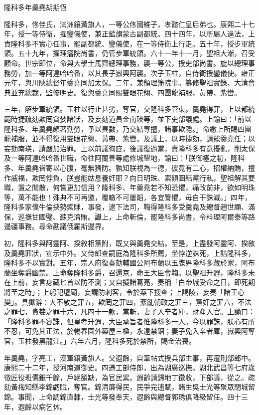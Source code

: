 
\begin{pinyinscope}
隆科多年羹堯胡期恆

隆科多，佟佳氏，滿洲鑲黃旗人，一等公佟國維子，孝懿仁皇后弟也。康熙二十七年，授一等侍衛，擢鑾儀使，兼正藍旗蒙古副都統。四十四年，以所屬人違法，上責隆科多不實心任事，罷副都統、鑾儀使，在一等侍衛上行走。五十年，授步軍統領。五十九年，擢理籓院尚書，仍管步軍統領。六十一年十一月，聖祖大漸，召受顧命。世宗即位，命與大學士馬齊總理事務，襲一等公，授吏部尚書。旋以總理事務勞，加一等阿達哈哈番，以其長子嶽興阿襲。次子玉柱，自侍衛授鑾儀使。雍正元年，與川陜總督年羹堯同加太保。二年，兼領理籓院事。纂修聖祖實錄、大清會典並充總裁，監修明史。復與羹堯同賜雙眼花翎、四團龍補服、黃帶、紫轡。

三年，解步軍統領。玉柱以行止甚劣，奪官，交隆科多管束。羹堯得罪，上以都統範時捷疏劾欺罔貪婪諸狀，及妄劾道員金南瑛等，並下吏部議處。上諭曰：「前以隆科多、年羹堯頗著勤勞，予以異數，乃交結專擅，諸事欺隱。」命繳上所賜四團龍補服，並不得復用雙眼花翎、黃帶、紫轡。及議上，以時捷劾，請罷羹堯任；以妄劾南瑛，請嚴加治罪。上以前議徇庇，後議復過當，責隆科多有意擾亂，削太保及一等阿達哈哈番世職，命往阿蘭善等處修城墾地，諭曰：「朕御極之初，隆科多、年羹堯皆寄以心腹，毫無猜防。孰知朕視為一德，彼竟有二心，招權納賄，擅作威福，欺罔悖負，朕豈能姑息養奸耶？向日明珠、索額圖結黨行私，聖祖解其要職，置之閒散，何嘗更加信用？隆科多、年羹堯若不知恐懼，痛改前非，欲如明珠等，萬不能也！殊典不可再邀，覆轍不可屢蹈，各宜警懼，毋自干誅滅。」四年，隆科多家僕牛倫挾勢索賕，事發，逮下法司，鞫得隆科多受羹堯及總督趙世顯、滿保，巡撫甘國璧、蘇克濟賄。讞上，上命斬倫，罷隆科多尚書，令料理阿爾泰等路邊疆事務。尋命勘議俄羅斯邊界。

初，隆科多與阿靈阿、揆敘相黨附，既又與羹堯交結。至是，上盡發阿靈阿、揆敘及羹堯罪狀，宣示中外。又侍郎查嗣庭為隆科多所薦，坐悖逆誅死，上詰隆科多，隆科多不以實對。五年，宗人府復奏劾輔國公阿布蘭以玉牒畀隆科多藏於家，阿布蘭坐奪爵幽禁。上命奪隆科多爵，召還京，命王大臣會鞫。以聖祖升遐，隆科多未在上前，妄言身藏匕首以防不測；又自擬諸葛亮，奏稱「白帝城受命之日，即死期將至之時」；上躬祀壇廟，妄謂防刺客，令於案下搜查；上謁陵，妄奏「諸王心變」。具獄辭：大不敬之罪五，欺罔之罪四，紊亂朝政之罪三，黨奸之罪六，不法之罪七，貪婪之罪十六，凡四十一款，當斬，妻子入辛者庫，財產入官。上諭曰：「隆科多罪不容誅，但皇考升遐，大臣承旨者惟隆科多一人。今以罪誅，朕心有所不忍，可免其正法，於暢春園外築屋三楹，永遠禁錮；妻子免入辛者庫，嶽興阿奪官，玉柱發黑龍江。」六年六月，隆科多死於禁所，賜金治喪。

年羹堯，字亮工，漢軍鑲黃旗人。父遐齡，自筆帖式授兵部主事，再遷刑部郎中。康熙二十二年，授河南道御史。四遷工部侍郎，出為湖廣巡撫。湖北武昌等七府歲徵匠役班價銀千餘，戶絕額缺，為官民累。遐齡請歸地丁徵收，下部議，從之。疏劾黃梅知縣李錦虧賦，奪官。錦清廉得民，民爭完逋賦，諸生吳士光等聚眾閉城留錦。事聞，上命調錦直隸，士光等發奉天，遐齡與總督郭琇俱降級留任。四十三年，遐齡以病乞休。


\end{pinyinscope}
